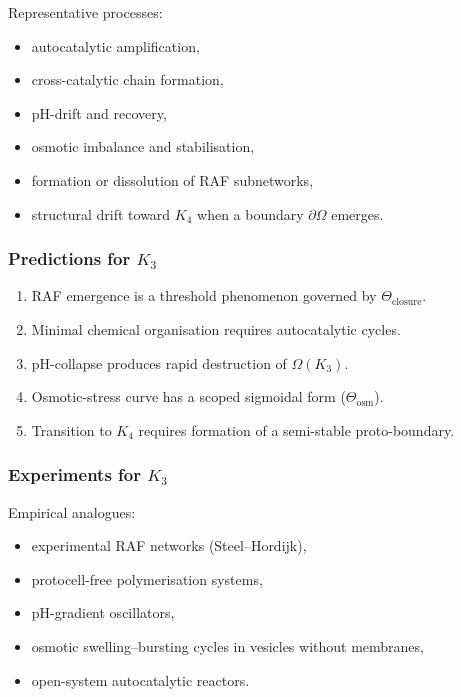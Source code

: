 Representative processes:
\begin{itemize}
    \item autocatalytic amplification,
    \item cross-catalytic chain formation,
    \item pH-drift and recovery,
    \item osmotic imbalance and stabilisation,
    \item formation or dissolution of RAF subnetworks,
    \item structural drift toward $K_4$ when a boundary $\partial\Omega$
          emerges.
\end{itemize}

\subsubsection{Predictions for \texorpdfstring{$K_3$}{K_3}}

\begin{enumerate}
    \item RAF emergence is a threshold phenomenon governed by
          $\Theta_{\mathrm{closure}}$.
    \item Minimal chemical organisation requires autocatalytic cycles.
    \item pH-collapse produces rapid destruction of $\Omega(K_3)$.
    \item Osmotic-stress curve has a scoped sigmoidal form 
          ($\Theta_{\mathrm{osm}}$).
    \item Transition to $K_4$ requires formation of a semi-stable
          proto-boundary.
\end{enumerate}

\subsubsection{Experiments for \texorpdfstring{$K_3$}{K_3}}

Empirical analogues:
\begin{itemize}
    \item experimental RAF networks (Steel–Hordijk),
    \item protocell-free polymerisation systems,
    \item pH-gradient oscillators,
    \item osmotic swelling–bursting cycles in vesicles without membranes,
    \item open-system autocatalytic reactors.
\end{itemize}

